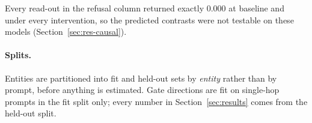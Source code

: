 \documentclass{article}
\newif\ifredflags
\newcommand{\rv}[1]{\ifredflags{\textcolor{red}{\textbf{[VERIFY: #1]}}}\fi}
\begin{document}
\begin{center}
\small
{}
\label{tab:causal}
\vspace{1pt}
\vspace{1pt}
{\footnotesize Every read-out in the refusal column returned exactly $0.000$ at baseline and under
every intervention, so the predicted contrasts were not testable on these models
(Section~\ref{sec:res-causal}).}
\vspace{-1.15em}
\end{center}

\paragraph{Splits.} Entities are partitioned into fit and held-out sets by \emph{entity} rather than by
prompt, before anything is estimated. Gate directions are fit on single-hop prompts in the fit split
only; every number in Section~\ref{sec:results} comes from the held-out split.
\rv{whether the partition covers $b_1$ and $a$ or only $e_1$. This is the leakage vector that matters
here: if a test item's \emph{bridge} appeared as a written entity in a fit-split single-hop prompt,
the direction was fit on activations from that very referent and then read at its latent position, and
the transfer result is partly memorization. Confirm the partition is over the union
$\{e_1,b_1,a\}$, or re-split and re-report.}
\end{document}
